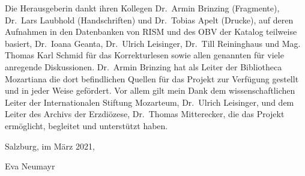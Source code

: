 Die Herausgeberin dankt ihren Kollegen Dr.~Armin Brinzing (Fragmente), Dr.~Lars Laubhold (Handschriften) und Dr.~Tobias Apelt (Drucke), auf deren Aufnahmen in den Datenbanken von RISM und des OBV der Katalog teilweise basiert, Dr.~Ioana Geanta, Dr.~Ulrich Leisinger, Dr.~Till Reininghaus und Mag. Thomas Karl Schmid für das Korrekturlesen sowie allen genannten für  viele anregende Diskussionen. Dr.~Armin Brinzing hat als Leiter der Bibliotheca Mozartiana die dort befindlichen Quellen für das Projekt zur Verfügung gestellt und in jeder Weise gefördert. Vor allem gilt mein Dank dem wissenschaftlichen Leiter der Internationalen Stiftung Mozarteum, Dr.~Ulrich Leisinger, und dem Leiter des Archivs der Erzdiözese, Dr.~Thomas Mitterecker, die das Projekt ermöglicht, begleitet und unterstützt haben.\bigskip

Salzburg, im März 2021,\bigskip


Eva Neumayr
	  
